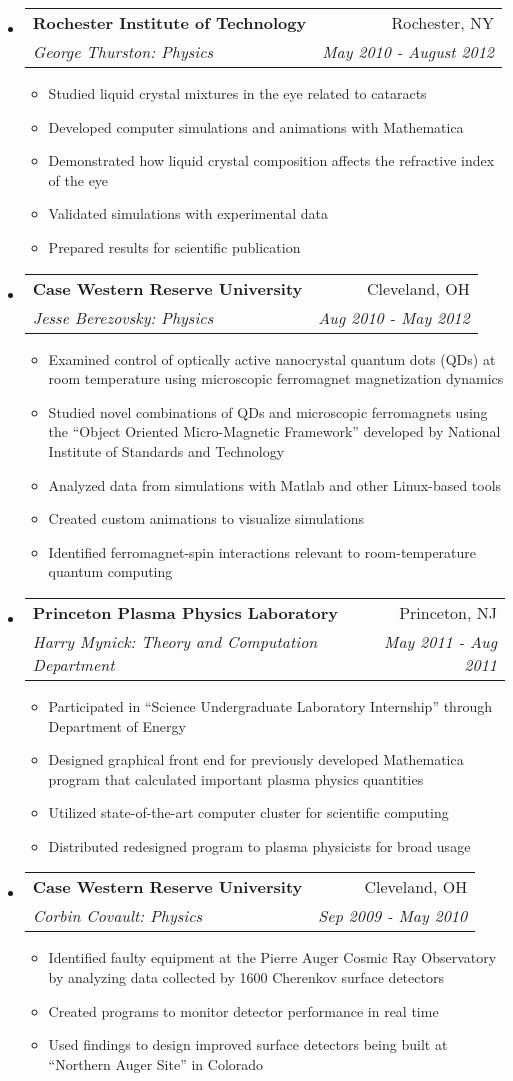 \documentclass[letterpaper,11pt]{article}
\makeatletter
\newcommand{\resitem}[1]{\item #1 \vspace{-2pt}}
\newcommand{\ressubheading}[4]{\vspace{-14pt}
\begin{tabular*}{7.0in}{l@{\extracolsep{\fill}}r}
		\\
		\textbf{#1} & #2 \\
		\textit{#3} & \textit{#4} \\
\end{tabular*}\vspace{-6pt}}
\makeatother
\begin{document}
\begin{itemize}
	
\item
	\ressubheading{Rochester Institute of Technology}{Rochester, NY}{George Thurston: Physics}{May 2010 - August 2012}
	\begin{itemize}
		\resitem{Studied liquid crystal mixtures in the eye related to cataracts}
		\resitem{Developed computer simulations and animations with Mathematica}
		\resitem{Demonstrated how liquid crystal composition affects the refractive index of the eye}
	 	\resitem{Validated simulations with experimental data}
	 	\resitem{Prepared results for scientific publication}
	\end{itemize}	
	
\item
	\ressubheading{Case Western Reserve University}{Cleveland, OH}{Jesse Berezovsky: Physics}{Aug 2010 - May 2012}
	\begin{itemize}
		\resitem{Examined control of optically active nanocrystal quantum dots (QDs) at room temperature using microscopic ferromagnet magnetization dynamics}
		\resitem{Studied novel combinations of QDs and microscopic ferromagnets using the ``Object Oriented Micro-Magnetic Framework'' developed by National Institute of Standards and Technology}
		\resitem{Analyzed data from simulations with Matlab and other Linux-based tools}
		\resitem{Created custom animations to visualize simulations}
		\resitem{Identified ferromagnet-spin interactions relevant to room-temperature quantum computing}
		
	\end{itemize}
\item
	\ressubheading{Princeton Plasma Physics Laboratory}{Princeton, NJ}{Harry Mynick: Theory and Computation Department}{May 2011 - Aug 2011}
	\begin{itemize}	
		\resitem{Participated in ``Science Undergraduate Laboratory Internship'' through Department of Energy}
		\resitem{Designed graphical front end for previously developed Mathematica program that calculated important plasma physics quantities}
		\resitem{Utilized state-of-the-art computer cluster for scientific computing}
		\resitem{Distributed redesigned program to plasma physicists for broad usage}		
	\end{itemize}	

\item
	\ressubheading{Case Western Reserve University}{Cleveland, OH}{Corbin Covault: Physics}{Sep 2009 - May 2010}
	\begin{itemize}
		\resitem{Identified faulty equipment at the Pierre Auger Cosmic Ray Observatory by analyzing data collected by 1600 Cherenkov surface detectors}
		\resitem{Created programs to monitor detector performance in real time} 
		\resitem{Used findings to design improved surface detectors being built at ``Northern Auger Site'' in Colorado}
	\end{itemize}


\end{itemize}
\end{document}
